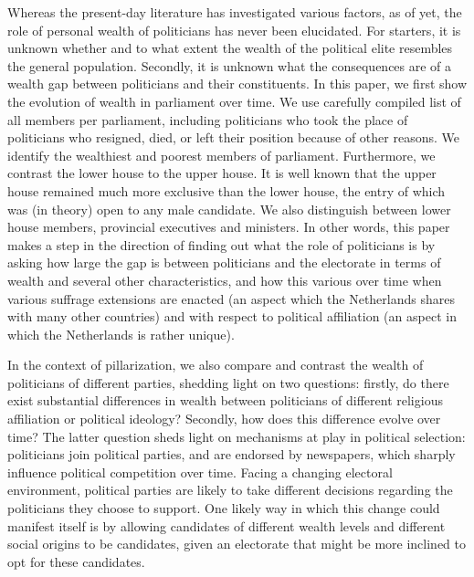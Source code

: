 Whereas the present-day literature has investigated various factors, as of yet, the role of personal wealth of politicians has never been elucidated. For starters, it is unknown whether and to what extent the wealth of the political elite resembles the general population. Secondly, it is unknown what the consequences are of a wealth gap between politicians and their constituents. In this paper, we first show the evolution of wealth in parliament over time. We use carefully compiled list of all members per parliament, including politicians who took the place of politicians who resigned, died, or left their position because of other reasons. We identify the wealthiest and poorest members of parliament. Furthermore, we contrast the lower house to the upper house. It is well known that the upper house remained much more exclusive than the lower house, the entry of which was (in theory) open to any male candidate. \autocite{van1983toegang} We also distinguish between lower house members, provincial executives and ministers. In other words, this paper makes a step in the direction of finding out what the role of politicians is by asking how large the gap is between politicians and the electorate in terms of wealth and several other characteristics, and how this various over time when various suffrage extensions are enacted (an aspect which the Netherlands shares with many other countries) and with respect to political affiliation (an aspect in which the Netherlands is rather unique). 

In the context of pillarization, we also compare and contrast the wealth of politicians of different parties, shedding light on two questions: firstly, do there exist substantial differences in wealth between politicians of different religious affiliation or political ideology? Secondly, how does this difference evolve over time? The latter question sheds light on mechanisms at play in political selection: politicians join political parties, and are endorsed by newspapers, which sharply influence political competition over time. Facing a changing electoral environment, political parties are likely to take different decisions regarding the politicians they choose to support. One likely way in which this change could manifest itself is by allowing candidates of different wealth levels and different social origins to be candidates, given an electorate that might be more inclined to opt for these candidates. 

